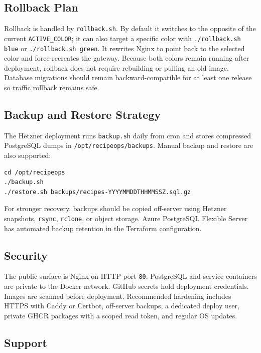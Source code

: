 \documentclass[11pt,a4paper]{article}
\begin{document}
\subsection{Rollback Plan}

Rollback is handled by \texttt{rollback.sh}. By default it switches to the opposite of the current \texttt{ACTIVE\_COLOR}; it can also target a specific color with \texttt{./rollback.sh blue} or \texttt{./rollback.sh green}. It rewrites Nginx to point back to the selected color and force-recreates the gateway. Because both colors remain running after deployment, rollback does not require rebuilding or pulling an old image. Database migrations should remain backward-compatible for at least one release so traffic rollback remains safe.

\subsection{Backup and Restore Strategy}

The Hetzner deployment runs \texttt{backup.sh} daily from cron and stores compressed PostgreSQL dumps in \texttt{/opt/recipeops/backups}. Manual backup and restore are also supported:

\begin{lstlisting}
cd /opt/recipeops
./backup.sh
./restore.sh backups/recipes-YYYYMMDDTHHMMSSZ.sql.gz
\end{lstlisting}

For stronger recovery, backups should be copied off-server using Hetzner snapshots, \texttt{rsync}, \texttt{rclone}, or object storage. Azure PostgreSQL Flexible Server has automated backup retention in the Terraform configuration.

\subsection{Security}

The public surface is Nginx on HTTP port \texttt{80}. PostgreSQL and service containers are private to the Docker network. GitHub secrets hold deployment credentials. Images are scanned before deployment. Recommended hardening includes HTTPS with Caddy or Certbot, off-server backups, a dedicated deploy user, private GHCR packages with a scoped read token, and regular OS updates.

\subsection{Support}
\end{document}
